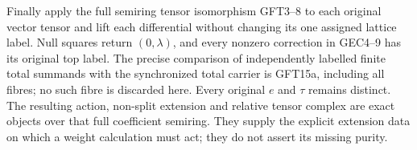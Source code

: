 Finally apply the full semiring tensor isomorphism GFT3--8 to
each original vector tensor and lift each differential without
changing its one assigned lattice label. Null squares return
$(0,\lambda)$, and every nonzero correction in GEC4--9 has
its original top label. The precise comparison of independently
labelled finite total summands with the synchronized total
carrier is GFT15a, including all fibres; no such fibre is
discarded here. Every original $e$ and $\tau$ remains distinct.
The resulting action, non-split extension and relative tensor
complex are exact objects over that full coefficient semiring.
They supply the explicit extension data on which a weight
calculation must act; they do not assert its missing purity.
